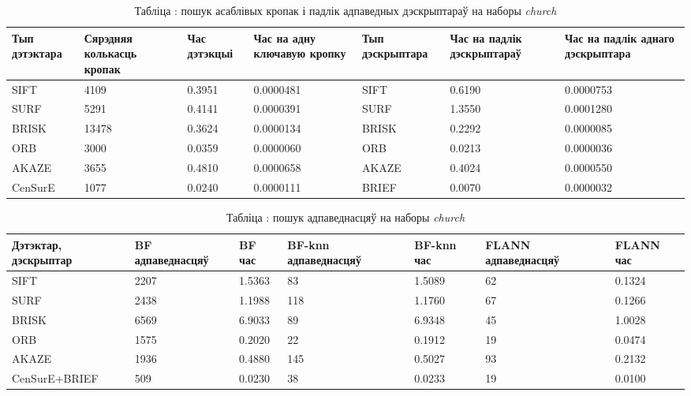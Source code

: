 \begin{table}[h]
  \centering
  \begin{footnotesize}
  \begin{tabular}{ | p{16mm} | p{17mm} | p{19mm} | p{22mm} | p{20mm} | p{22mm} | p{22mm} | }
    \hline
    Тып дэтэктара & Сярэдняя колькасць кропак & Час дэтэкцыі & Час на адну ключавую кропку & Тып дэскрыптара & Час на падлік дэскрыптараў & Час на падлік аднаго дэскрыптара \\ \hline
    SIFT & 4109 & 0.3951 & 0.0000481 & SIFT & 0.6190 & 0.0000753 \\ \hline
    SURF & 5291 & 0.4141 & 0.0000391 & SURF & 1.3550 & 0.0001280 \\ \hline
    BRISK & 13478 & 0.3624 & 0.0000134 & BRISK & 0.2292 & 0.0000085 \\ \hline
    ORB & 3000 & 0.0359 & 0.0000060 & ORB & 0.0213 & 0.0000036 \\ \hline
    AKAZE & 3655 & 0.4810 & 0.0000658 & AKAZE & 0.4024 & 0.0000550 \\ \hline
    CenSurE & 1077 & 0.0240 & 0.0000111 & BRIEF & 0.0070 & 0.0000032 \\ \hline
  \end{tabular}
  \end{footnotesize}
\captionsetup{labelformat=empty,justification=centering}
\caption{Табліца : пошук асаблівых кропак і падлік адпаведных дэскрыптараў на наборы \textit{church}}
\label{table:church-kp}
\end{table}

\begin{table}[h]
  \centering
  \begin{footnotesize}
  \begin{tabular}{ | p{20mm} | p{22mm} | p{15mm} | p{22mm} | p{15mm} | p{22mm} | p{15mm} | }
    \hline
    Дэтэктар, дэскрыптар & BF адпаведнасцяў & BF час & BF-knn адпаведнасцяў & BF-knn час & FLANN адпаведнасцяў & FLANN час \\ \hline
    SIFT & 2207 & 1.5363 & 83 & 1.5089 & 62 & 0.1324 \\ \hline
    SURF & 2438 & 1.1988 & 118 & 1.1760 & 67 & 0.1266 \\ \hline
    BRISK & 6569 & 6.9033 & 89 & 6.9348 & 45 & 1.0028 \\ \hline
    ORB & 1575 & 0.2020 & 22 & 0.1912 & 19 & 0.0474 \\ \hline
    AKAZE & 1936 & 0.4880 & 145 & 0.5027 & 93 & 0.2132 \\ \hline
    CenSurE+\newline BRIEF & 509 & 0.0230 & 38 & 0.0233 & 19 & 0.0100 \\ \hline
  \end{tabular}
  \end{footnotesize}
\captionsetup{labelformat=empty,justification=centering}
\caption{Табліца : пошук адпаведнасцяў на наборы \textit{church}}
\label{table:church-matching}
\end{table}

